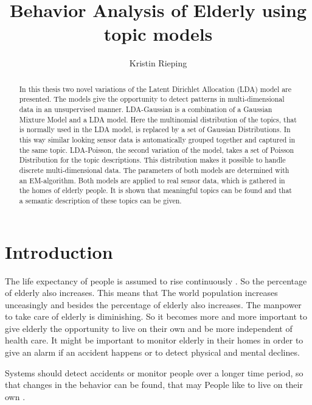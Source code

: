 \documentclass[a4paper,fleqn]{article}
\title{Behavior Analysis of Elderly using topic models}
\author{Kristin Rieping}
\begin{document}
\maketitle
\pagebreak
\tableofcontents
\pagebreak

\begin{abstract}
In this thesis two novel variations of the Latent Dirichlet Allocation (LDA) model are presented. The models give the opportunity to detect patterns in multi-dimensional data in an unsupervised manner. LDA-Gaussian is a combination of a Gaussian Mixture Model and a LDA model. Here the multinomial distribution of the topics, that is normally used in the LDA model, is replaced by a set of Gaussian Distributions. In this way similar looking sensor data is automatically grouped together and captured in the same topic.
LDA-Poisson, the second variation of the model, takes a set of Poisson Distribution for the topic descriptions. This distribution makes it possible to handle discrete multi-dimensional data. The parameters of both models are determined with an EM-algorithm.
Both models are applied to real sensor data, which is gathered in the homes of elderly people. It is shown that meaningful topics can be found and that a semantic description of these topics can be given.


\end{abstract}


\section{Introduction}
The life expectancy of people is assumed to rise continuously \cite{4864}. So the percentage of elderly also increases. This means that
The world population increases unceasingly and besides the percentage of elderly also increases. The manpower to take care of elderly is diminishing. So it becomes more and more important to give elderly the opportunity to live on their own and be more independent of health care. It might be important to monitor elderly in their homes in order to give an alarm if an accident happens or to detect physical and mental declines.

Systems should detect accidents or monitor people over a longer time period, so that changes in the behavior can be found, that may 
People like to live on their own \cite{Cavallo:1315167}.
\end{document}
